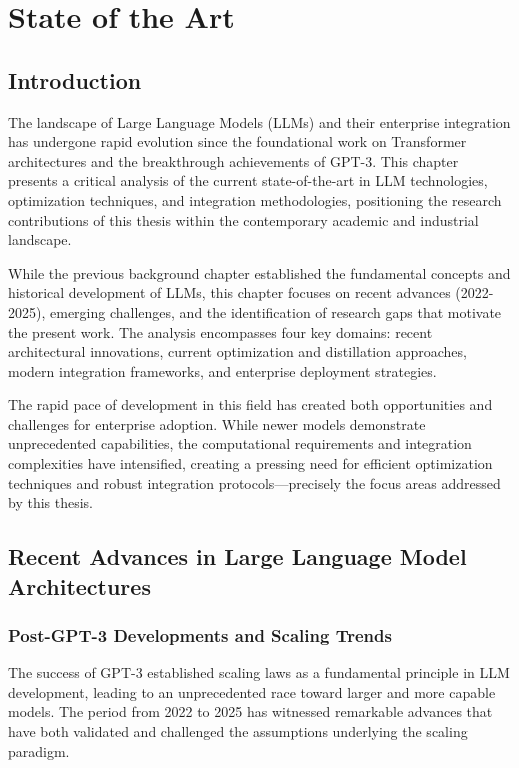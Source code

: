 
\chapter{State of the Art}

\section{Introduction}

The landscape of Large Language Models (LLMs) and their enterprise integration has undergone rapid evolution since the foundational work on Transformer architectures and the breakthrough achievements of GPT-3. This chapter presents a critical analysis of the current state-of-the-art in LLM technologies, optimization techniques, and integration methodologies, positioning the research contributions of this thesis within the contemporary academic and industrial landscape.

While the previous background chapter established the fundamental concepts and historical development of LLMs, this chapter focuses on recent advances (2022-2025), emerging challenges, and the identification of research gaps that motivate the present work. The analysis encompasses four key domains: recent architectural innovations, current optimization and distillation approaches, modern integration frameworks, and enterprise deployment strategies.

The rapid pace of development in this field has created both opportunities and challenges for enterprise adoption. While newer models demonstrate unprecedented capabilities, the computational requirements and integration complexities have intensified, creating a pressing need for efficient optimization techniques and robust integration protocols—precisely the focus areas addressed by this thesis.

\section{Recent Advances in Large Language Model Architectures}

\subsection{Post-GPT-3 Developments and Scaling Trends}

The success of GPT-3 \cite{AttentionIsAllYouNeed} established scaling laws as a fundamental principle in LLM development, leading to an unprecedented race toward larger and more capable models. The period from 2022 to 2025 has witnessed remarkable advances that have both validated and challenged the assumptions underlying the scaling paradigm.

